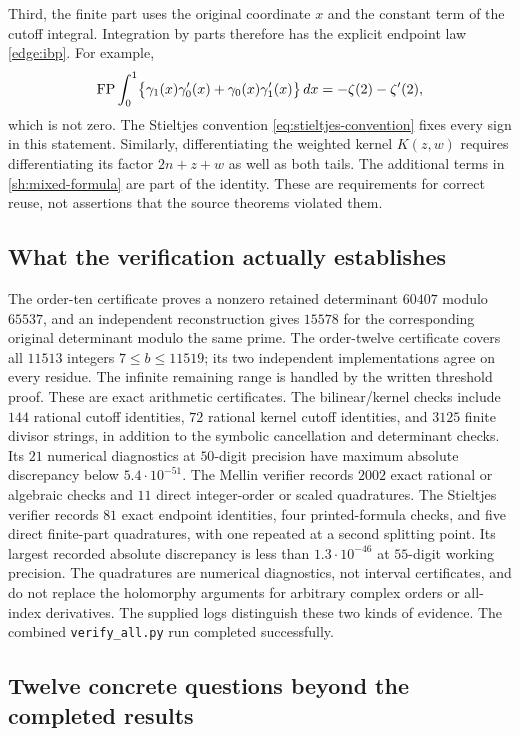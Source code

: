 Third, the finite part uses the original coordinate $x$ and the
constant term of the cutoff integral. Integration by parts therefore
has the explicit endpoint law \eqref{edge:ibp}. For example,
\[
 \operatorname{FP}\int_0^1\bigl\{
   \gamma_1(x)\gamma_0'(x)+\gamma_0(x)\gamma_1'(x)
   \bigr\}\,dx=-\zeta(2)-\zeta'(2),
\]
which is not zero. The Stieltjes convention
\eqref{eq:stieltjes-convention} fixes every sign in this statement.
Similarly, differentiating the weighted kernel $K(z,w)$ requires
differentiating its factor $2n+z+w$ as well as both tails. The
additional terms in \eqref{sh:mixed-formula} are part of the identity.
These are requirements for correct reuse, not assertions that the
source theorems violated them.

\subsection{What the verification actually establishes}

The order-ten certificate proves a nonzero retained determinant
$60407$ modulo $65537$, and an independent reconstruction gives
$15578$ for the corresponding original determinant modulo the same
prime. The order-twelve certificate covers all $11513$ integers
$7\le b\le11519$; its two independent implementations agree on every
residue. The infinite remaining range is handled by the written
threshold proof. These are exact arithmetic certificates. The
bilinear/kernel checks include $144$ rational cutoff identities,
$72$ rational kernel cutoff identities, and $3125$ finite divisor
strings, in addition to the symbolic cancellation and determinant
checks. Its $21$ numerical diagnostics at $50$-digit precision have
maximum absolute discrepancy below $5.4\cdot10^{-51}$.
The Mellin verifier records $2002$ exact rational or algebraic
checks and $11$ direct integer-order or scaled quadratures. The
Stieltjes verifier records $81$ exact endpoint identities, four
printed-formula checks, and five direct finite-part quadratures,
with one repeated at a second splitting point. Its largest recorded
absolute discrepancy is less than $1.3\cdot10^{-46}$ at $55$-digit
working precision. The quadratures are numerical diagnostics, not
interval certificates, and do not replace the holomorphy arguments
for arbitrary complex orders or all-index derivatives. The supplied
logs distinguish these two kinds of evidence. The combined
\texttt{verify\_all.py} run completed successfully.

\subsection{Twelve concrete questions beyond the completed results}

